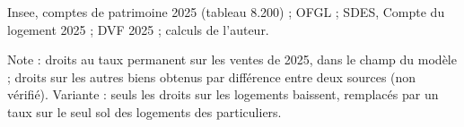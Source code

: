 Insee, comptes de patrimoine 2025 (tableau 8.200) ; OFGL ; SDES, Compte du logement 2025 ; DVF 2025 ; calculs de l'auteur.\par Note : droits au taux permanent sur les ventes de 2025, dans le champ du modèle ; droits sur les autres biens obtenus par différence entre deux sources (non vérifié). Variante : seuls les droits sur les logements baissent, remplacés par un taux sur le seul sol des logements des particuliers.
